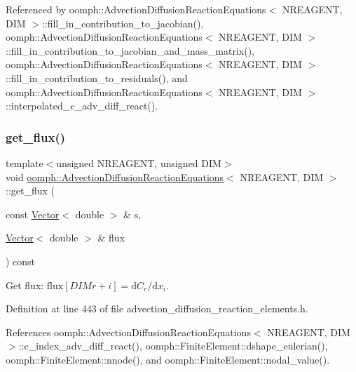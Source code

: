 Referenced by oomph\+::\+Advection\+Diffusion\+Reaction\+Equations$<$ N\+R\+E\+A\+G\+E\+N\+T, D\+I\+M $>$\+::fill\+\_\+in\+\_\+contribution\+\_\+to\+\_\+jacobian(), oomph\+::\+Advection\+Diffusion\+Reaction\+Equations$<$ N\+R\+E\+A\+G\+E\+N\+T, D\+I\+M $>$\+::fill\+\_\+in\+\_\+contribution\+\_\+to\+\_\+jacobian\+\_\+and\+\_\+mass\+\_\+matrix(), oomph\+::\+Advection\+Diffusion\+Reaction\+Equations$<$ N\+R\+E\+A\+G\+E\+N\+T, D\+I\+M $>$\+::fill\+\_\+in\+\_\+contribution\+\_\+to\+\_\+residuals(), and oomph\+::\+Advection\+Diffusion\+Reaction\+Equations$<$ N\+R\+E\+A\+G\+E\+N\+T, D\+I\+M $>$\+::interpolated\+\_\+c\+\_\+adv\+\_\+diff\+\_\+react().

\mbox{\label{classoomph_1_1AdvectionDiffusionReactionEquations_a492af587e1c592b0fb9ffe525d6509d2}} 
\subsubsection{\texorpdfstring{get\+\_\+flux()}{get\_flux()}}
{\footnotesize\ttfamily template$<$unsigned N\+R\+E\+A\+G\+E\+NT, unsigned D\+IM$>$ \\
void \hyperlink{classoomph_1_1AdvectionDiffusionReactionEquations}{oomph\+::\+Advection\+Diffusion\+Reaction\+Equations}$<$ N\+R\+E\+A\+G\+E\+NT, D\+IM $>$\+::get\+\_\+flux (\begin{DoxyParamCaption}\item[{const \hyperlink{classoomph_1_1Vector}{Vector}$<$ double $>$ \&}]{s,  }\item[{\hyperlink{classoomph_1_1Vector}{Vector}$<$ double $>$ \&}]{flux }\end{DoxyParamCaption}) const\hspace{0.3cm}{\ttfamily [inline]}}



Get flux\+: $\mbox{flux}[DIM r + i] = \mbox{d}C_{r} / \mbox{d}x_i $. 



Definition at line 443 of file advection\+\_\+diffusion\+\_\+reaction\+\_\+elements.\+h.



References oomph\+::\+Advection\+Diffusion\+Reaction\+Equations$<$ N\+R\+E\+A\+G\+E\+N\+T, D\+I\+M $>$\+::c\+\_\+index\+\_\+adv\+\_\+diff\+\_\+react(), oomph\+::\+Finite\+Element\+::dshape\+\_\+eulerian(), oomph\+::\+Finite\+Element\+::nnode(), and oomph\+::\+Finite\+Element\+::nodal\+\_\+value().



